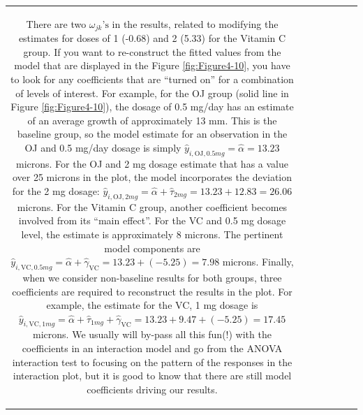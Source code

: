 \documentclass[]{book}
\newenvironment{Shaded}{\begin{snugshade}}{\end{snugshade}}
\theoremstyle{definition}
\theoremstyle{definition}
\theoremstyle{remark}
\begin{document}
\begin{longtable}[]{@{}ccccccc@{}}
\begin{minipage}[b]{0.10\columnwidth}
\begin{Shaded}
\begin{Highlighting}[]
\begin{Shaded}
\begin{Highlighting}[]
\begin{Shaded}
\begin{Highlighting}[]
There are two \(\omega_{jk}\text{'s}\) in the results, related to
modifying the estimates for doses of 1 (-0.68) and 2 (5.33) for the
Vitamin C group. If you want to re-construct the fitted values from the
model that are displayed in the Figure \ref{fig:Figure4-10}, you have to
look for any coefficients that are ``turned on'' for a combination of
levels of interest. For example, for the OJ group (solid line in Figure
\ref{fig:Figure4-10}), the dosage of 0.5 mg/day has an estimate of an
average growth of approximately 13 mm. This is the baseline group, so
the model estimate for an observation in the OJ and 0.5 mg/day dosage is
simply \(\hat{y}_{i,\text{OJ},0.5mg}=\hat{\alpha}=13.23\) microns. For
the OJ and 2 mg dosage estimate that has a value over 25 microns in the
plot, the model incorporates the deviation for the 2 mg dosage:
\(\hat{y}_{i,\text{OJ},2mg}=\hat{\alpha} + \hat{\tau}_{2mg}=13.23 + 12.83 = 26.06\)
microns. For the Vitamin C group, another coefficient becomes involved
from its ``main effect''. For the VC and 0.5 mg dosage level, the
estimate is approximately 8 microns. The pertinent model components are
\(\hat{y}_{i,\text{VC},0.5mg}=\hat{\alpha} + \hat{\gamma}_{\text{VC}}=13.23 + (-5.25) = 7.98\)
microns. Finally, when we consider non-baseline results for both groups,
three coefficients are required to reconstruct the results in the plot.
For example, the estimate for the VC, 1 mg dosage is
\(\hat{y}_{i,\text{VC},1mg}=\hat{\alpha} + \hat{\tau}_{1mg} + \hat{\gamma}_{\text{VC}} =13.23 + 9.47 + (-5.25) = 17.45\)
microns. We usually will by-pass all this fun(!) with the coefficients
in an interaction model and go from the ANOVA interaction test to
focusing on the pattern of the responses in the interaction plot, but it
is good to know that there are still model coefficients driving our
results.





\end{Highlighting}
\end{Shaded}
\end{Highlighting}
\end{Shaded}
\end{Highlighting}
\end{Shaded}
\end{minipage}
\end{longtable}
\end{document}
